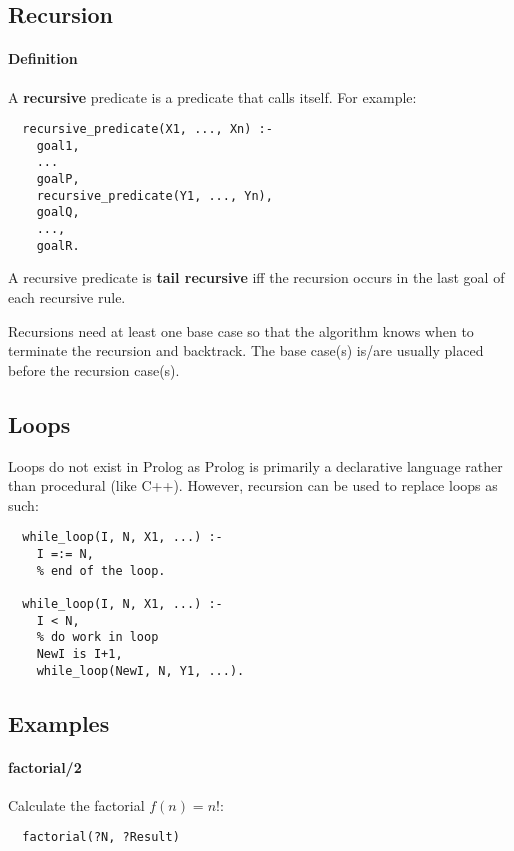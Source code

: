 \documentclass{article}
\begin{document}
\begin{multicols}{2}
  \section{Recursion}
  
  \paragraph{Definition} A {\bf recursive} predicate is a predicate that calls itself. For example:
  
  \begin{lstlisting}
  recursive_predicate(X1, ..., Xn) :-
    goal1,
    ...
    goalP,
    recursive_predicate(Y1, ..., Yn),
    goalQ,
    ...,
    goalR.
  \end{lstlisting}
  
  A recursive predicate is {\bf tail recursive} iff the recursion occurs in the last goal of each recursive rule. 
  
  Recursions need at least one base case so that the algorithm knows when to terminate the recursion and backtrack. The base case(s) is/are usually placed before the recursion case(s).
  
  \subsection{Loops}
  
  Loops do not exist in Prolog as Prolog is primarily a declarative language rather than procedural (like C++). However, recursion can be used to replace loops as such:
  
  \begin{lstlisting}
  while_loop(I, N, X1, ...) :-
    I =:= N,
    % end of the loop.
  
  while_loop(I, N, X1, ...) :-
    I < N,
    % do work in loop
    NewI is I+1,
    while_loop(NewI, N, Y1, ...).
  \end{lstlisting}
  
  \subsection{Examples}  
  
  \paragraph{factorial/2} Calculate the factorial $f(n) = n!$:
  
  \begin{lstlisting}
  factorial(?N, ?Result)
  \end{lstlisting} 
  

\end{multicols}
\end{document}
